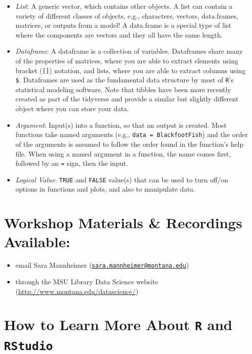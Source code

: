 \documentclass[
  10pt,
  letterpaper,
  twoside,
  openright]{book}
\begin{document}
\begin{itemize}
  class, a matrix is an object with rows and columns, where every entry
  in the matrix must be a number.
\item
  \emph{List}: A generic vector, which contains other objects. A list
  can contain a variety of different classes of objects, e.g.,
  characters, vectors, data.frames, matrices, or outputs from a model! A
  data.frame is a special type of list where the components are vectors
  and they all have the same length.
\item
  \emph{Dataframe}: A dataframe is a collection of variables. Dataframes
  share many of the properties of matrices, where you are able to
  extract elements using bracket (\texttt{{[}{]}}) notation, and lists,
  where you are able to extract columns using \texttt{\$}. Dataframes
  are used as the fundamental data structure by most of \texttt{R}'s
  statistical modeling software. Note that tibbles have been more
  recently created as part of the tidyverse and provide a similar but
  slightly different object where you can store your data.
\item
  \emph{Argument}: Input(s) into a function, so that an output is
  created. Most functions take named arguments (e.g.,
  \texttt{data\ =\ BlackfootFish}) and the order of the arguments is
  assumed to follow the order found in the function's help file. When
  using a named argument in a function, the name comes first, followed
  by an \texttt{=} sign, then the input.
\item
  \emph{Logical Value}: \texttt{TRUE} and \texttt{FALSE} value(s) that
  can be used to turn off/on options in functions and plots, and also to
  manipulate data.
\end{itemize}

\hypertarget{workshop-materials-recordings-available}{%
\section{Workshop Materials \& Recordings
Available:}\label{workshop-materials-recordings-available}}

\begin{itemize}
\item
  email Sara Mannheimer
  (\href{mailto:sara.mannheimer@montana.edu}{\nolinkurl{sara.mannheimer@montana.edu}})
\item
  through the MSU Library Data Science website
  (\url{http://www.montana.edu/datascience/})
\end{itemize}

\hypertarget{how-to-learn-more-about-r-and-rstudio}{%
\section{\texorpdfstring{How to Learn More About \texttt{R} and
\texttt{RStudio}}{How to Learn More About R and RStudio}}\label{how-to-learn-more-about-r-and-rstudio}}
\end{document}
